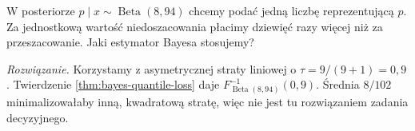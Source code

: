 \begin{zadanie}
W posteriorze $p\mid x\sim\operatorname{Beta}(8,94)$ chcemy
podać jedną liczbę reprezentującą $p$. Za jednostkową wartość
niedoszacowania płacimy dziewięć razy więcej niż za przeszacowanie.
Jaki estymator Bayesa stosujemy?
\par\emph{Rozwiązanie.} Korzystamy z asymetrycznej straty
liniowej o $\tau=9/(9+1)=0{,}9$. Twierdzenie
\ref{thm:bayes-quantile-loss} daje $F_{\operatorname{Beta}(8,94)}^{-1}(0{,}9)$.
Średnia $8/102$ minimalizowałaby inną, kwadratową stratę,
więc nie jest tu rozwiązaniem zadania decyzyjnego.
\end{zadanie}

